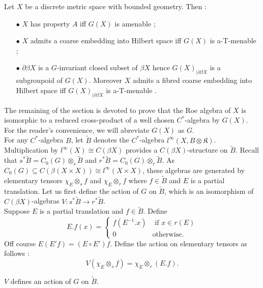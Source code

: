 \begin{thm}\label{propertiesXG}
Let $X$ be a discrete metric space with bounded geometry. Then :
\begin{itemize}
\item[$\bullet$] $X$ has property $A$ iff $G(X)$ is amenable \cite{SkTuYu};
\item[$\bullet$] $X$ admits a coarse embedding into Hilbert space iff $G(X)$ is a-T-menable \cite{SkTuYu};
\item[$\bullet$] $\partial \beta X$ is a $G$-invariant closed subset of $\beta X$ hence $G(X)_{|\partial\beta X}$ is a subgroupoid of $G(X)$. Moreover $X$ admits a fibred coarse embedding into Hilbert space iff $G(X)_{|\partial\beta X}$ is a-T-menable \cite{FinnSellFibred}.
\end{itemize}
\end{thm}

The remaining of the section is devoted to prove that the Roe algebra of $X$ is isomorphic to a reduced cross-product of a well chosen $C^*$-algebra by $G(X)$. For the reader's convenience, we will abreviate $G(X)$ as $G$.\\

For any $C^*$-algebra $B$, let $\tilde B$ denotes the $C^*$-algebra $l^\infty(X,B\otimes\mathfrak K)$. Multiplication by $l^\infty(X)\cong C(\beta X)$ provides a $C(\beta X)$-structure on $\tilde B$. Recall that $s^* \tilde B = C_0(G)\otimes_s \tilde B$ and $r^* \tilde B = C_0(G)\otimes_r \tilde B$. As $C_0(G)\subseteq C(\beta(X\times X))\cong l^\infty(X\times X)$, these algebras are generated by elementary tensors $\chi_E\otimes_s f$ and $\chi_E\otimes_r f$ where $f\in\tilde B$ and $E$ is a partial translation. Let us first define the action of $G$ on $\tilde B$, which is an isomorphism of $C(\beta X)$-algebras $V :s^* \tilde B\rightarrow r^* \tilde B$.\\

Suppose $E$ is a partial translation and $f\in\tilde B$. Define 
\[E.f(x) = \left\{\begin{array}{ll} f(E^{-1}.x) & \text{ if }x\in r(E)\\ 0 & \text{otherwise.}\end{array}\right.\]
Off course $E(E'f)=(E\circ E')f$. Define the action on elementary tensors as follows :
\[V(\chi_E \otimes_s f) = \chi_E \otimes_r (E.f).\]

\begin{lem}
$V$ defines an action of $G$ on $\tilde B$.
\end{lem}

